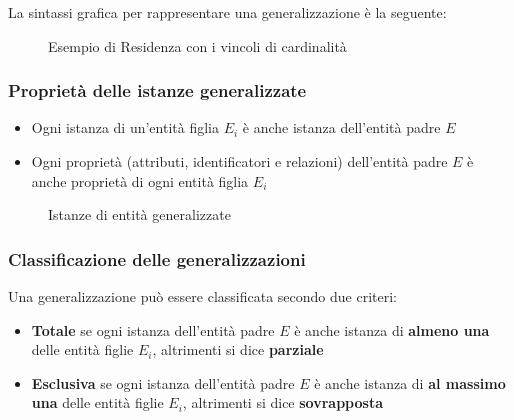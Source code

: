 \documentclass[a4paper]{article}
\begin{document}
\vspace{1em}
\noindent
La sintassi grafica per rappresentare una generalizzazione è la seguente:
\begin{figure}[H]
  \centering
  \caption{Esempio di Residenza con i vincoli di cardinalità}
\end{figure}

\subsubsection{Proprietà delle istanze generalizzate}
\begin{itemize}
  \item Ogni istanza di un'entità figlia \( E_i \) è anche istanza dell'entità padre \( E \)
  \item Ogni proprietà (attributi, identificatori e relazioni) dell'entità padre \( E \)
    è anche proprietà di ogni entità figlia \( E_i \) 
\end{itemize}
\begin{figure}[H]
  \centering
  \caption{Istanze di entità generalizzate}
\end{figure}

\subsubsection{Classificazione delle generalizzazioni}
Una generalizzazione può essere classificata secondo due criteri:
\begin{itemize}
  \item \textbf{Totale} se ogni istanza dell'entità padre \( E \) è anche istanza
    di \textbf{almeno una} delle entità figlie \( E_i \), altrimenti si dice
    \textbf{parziale}

  \item \textbf{Esclusiva} se ogni istanza dell'entità padre \( E \) è anche istanza
    di \textbf{al massimo una} delle entità figlie \( E_i \), altrimenti si dice
    \textbf{sovrapposta}
\end{itemize}
\end{document}
